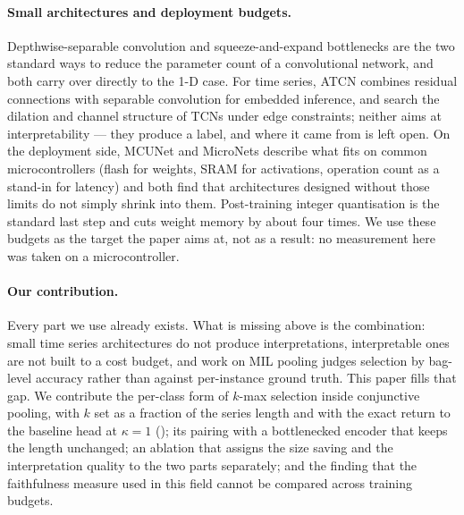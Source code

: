 \paragraph{Small architectures and deployment budgets.}
Depthwise-separable convolution \citep{chollet2017xception, howard2017mobilenets} and
squeeze-and-expand bottlenecks \citep{he2016resnet, iandola2016squeezenet, sandler2018mobilenetv2}
are the two standard ways to reduce the parameter count of a convolutional network, and both carry
over directly to the 1-D case. For time series, ATCN \citep{baharani2022atcn} combines residual
connections with separable convolution for embedded inference, and \citet{risso2023tcn} search the
dilation and channel structure of TCNs under edge constraints; neither aims at interpretability ---
they produce a label, and where it came from is left open. On the deployment side, MCUNet
\citep{lin2020mcunet} and MicroNets \citep{banbury2021micronets} describe what fits on common
microcontrollers (flash for weights, SRAM for activations, operation count as a stand-in for latency)
and both find that architectures designed without those limits do not simply shrink into them.
Post-training integer quantisation \citep{jacob2018quantization} is the standard last step and cuts
weight memory by about four times. We use these budgets as the target the paper aims at, not as a
result: no measurement here was taken on a microcontroller.

\paragraph{Our contribution.}
Every part we use already exists. What is missing above is the combination: small time series
architectures do not produce interpretations, interpretable ones are not built to a cost budget, and
work on MIL pooling judges selection by bag-level accuracy rather than against per-instance ground
truth. This paper fills that gap. We contribute the per-class form of $k$-max selection inside
conjunctive pooling, with $k$ set as a fraction of the series length and with the exact return to the
baseline head at $\kappa = 1$ (); its pairing with a bottlenecked encoder that keeps
the length unchanged; an ablation that assigns the size saving and the interpretation quality to the
two parts separately; and the finding that the faithfulness measure used in this field cannot be
compared across training budgets.
